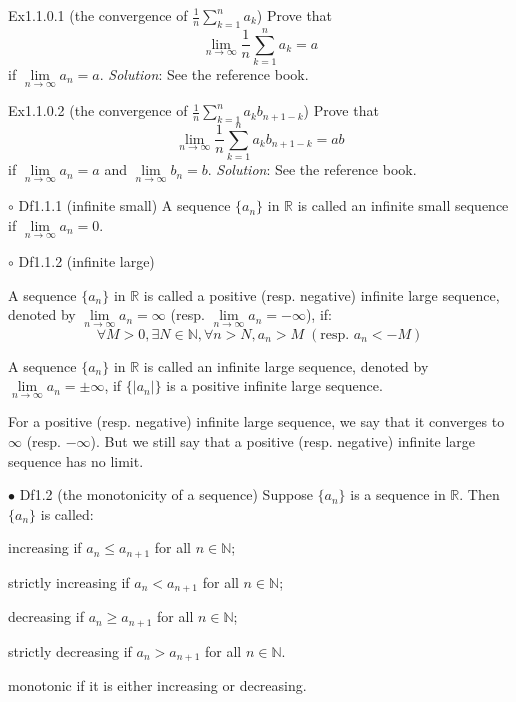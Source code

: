\documentclass{article}
\begin{document}
\begin{Th}{Ex1.1.0.1 (the convergence of $\frac{1}{n}\sum_{k=1}^{n} a_k$)}
    Prove that 
    $$\lim\limits_{n\to\infty}\frac{1}{n}\sum_{k=1}^{n} a_k = a$$
    if $\lim\limits_{n\to\infty}a_n=a$.
    \tcblower
    \textit{Solution}: See the reference book.
\end{Th}

\begin{Th}{Ex1.1.0.2 (the convergence of $\frac{1}{n}\sum_{k=1}^{n} a_k b_{n+1-k}$)}
    Prove that 
    $$\lim\limits_{n\to\infty}\frac{1}{n}\sum_{k=1}^{n} a_k b_{n+1-k} = a b$$
    if $\lim\limits_{n\to\infty}a_n=a$ and $\lim\limits_{n\to\infty}b_n=b$.
    \tcblower
    \textit{Solution}: See the reference book.
\end{Th}

\begin{Df}{$\circ$ Df1.1.1 (infinite small)}
    A sequence $\{a_n\}$ in $\mathbb{R}$ is called an infinite small sequence if $\lim\limits_{n\to\infty}a_n=0$.
\end{Df}

\begin{Df}{$\circ$ Df1.1.2 (infinite large)}
    \begin{compactenum}
        \item A sequence $\{a_n\}$ in $\mathbb{R}$ is called a positive (resp. negative) infinite large sequence, denoted by $\lim\limits_{n\to\infty}a_n=\infty$ (resp. $\lim\limits_{n\to\infty}a_n=-\infty$), if:
        $$\forall M>0, \exists N\in\mathbb{N}, \forall n > N, a_n>M \;(\text{resp. } a_n<-M)$$
        \item A sequence $\{a_n\}$ in $\mathbb{R}$ is called an infinite large sequence, denoted by $\lim\limits_{n\to\infty}a_n=\pm\infty$, if $\{|a_n|\}$ is a positive infinite large sequence.
    \end{compactenum}
\end{Df}

\begin{Rmk}{}
    For a positive (resp. negative) infinite large sequence, we say that it converges to $\infty$ (resp. $-\infty$). But we still say that a positive (resp. negative) infinite large sequence has no limit.
\end{Rmk}

\begin{Df}{$\bullet$ Df1.2 (the monotonicity of a sequence)}
    Suppose $\{a_n\}$ is a sequence in $\mathbb{R}$. Then $\{a_n\}$ is called:
    \begin{compactenum}
        \item increasing if $a_n\leq a_{n+1}$ for all $n\in\mathbb{N}$;
        \item strictly increasing if $a_n<a_{n+1}$ for all $n\in\mathbb{N}$;
        \item decreasing if $a_n\geq a_{n+1}$ for all $n\in\mathbb{N}$;
        \item strictly decreasing if $a_n>a_{n+1}$ for all $n\in\mathbb{N}$.
        \item monotonic if it is either increasing or decreasing.
    \end{compactenum}
\end{Df}
\end{document}
